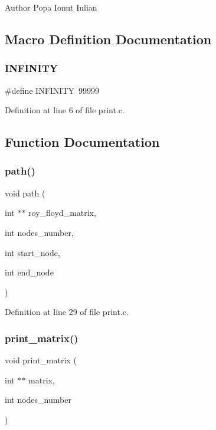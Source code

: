 \begin{DoxyAuthor}{Author}
Popa Ionut Iulian 
\end{DoxyAuthor}


\subsection{Macro Definition Documentation}
\mbox{\label{print_8c_a956e2723d559858d08644ac99146e910}} 
\subsubsection{I\+N\+F\+I\+N\+I\+TY}
{\footnotesize\ttfamily \#define I\+N\+F\+I\+N\+I\+TY~99999}



Definition at line 6 of file print.\+c.



\subsection{Function Documentation}
\mbox{\label{print_8c_a81a46cab620746bb88e7c79de23e9d76}} 
\subsubsection{path()}
{\footnotesize\ttfamily void path (\begin{DoxyParamCaption}\item[{int $\ast$$\ast$}]{roy\+\_\+floyd\+\_\+matrix,  }\item[{int}]{nodes\+\_\+number,  }\item[{int}]{start\+\_\+node,  }\item[{int}]{end\+\_\+node }\end{DoxyParamCaption})}



Definition at line 29 of file print.\+c.

\mbox{\label{print_8c_a921b41cb0b745c5a64f4987a06648ac2}} 
\subsubsection{print\+\_\+matrix()}
{\footnotesize\ttfamily void print\+\_\+matrix (\begin{DoxyParamCaption}\item[{int $\ast$$\ast$}]{matrix,  }\item[{int}]{nodes\+\_\+number }\end{DoxyParamCaption})}

